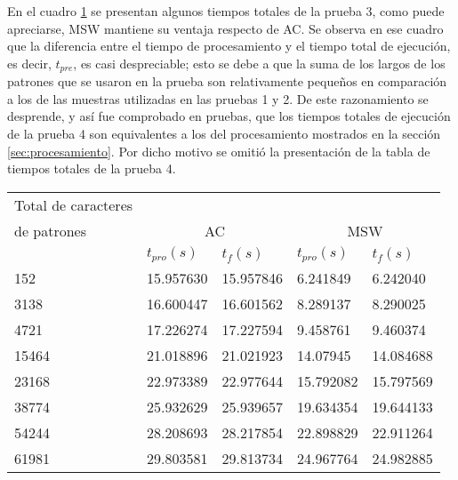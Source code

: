 {En el cuadro \ref{tab:Total3} se presentan algunos tiempos totales de la prueba 3, como puede apreciarse, MSW mantiene su ventaja respecto de AC. Se observa en ese cuadro que la diferencia entre el tiempo de procesamiento y el tiempo total de ejecución, es decir, $t_{pre}$, es casi despreciable; esto se debe a que la suma de los largos de los patrones que se usaron en la prueba son relativamente pequeños en comparación a los de las muestras utilizadas en las pruebas 1 y 2. De este razonamiento se desprende, y así fue comprobado en pruebas, que los tiempos totales de ejecución de la prueba 4 son equivalentes a los del procesamiento mostrados en la sección \ref{sec:procesamiento}. Por dicho motivo se omitió la presentación de la tabla de tiempos totales de la prueba 4.  
\begin{table}[H]
\begin{center}
 
\scalebox{0.7} {
\begin{tabular}{lllll}
\hline
  Total de caracteres\\ de patrones & \multicolumn{2}{c}{AC} & \multicolumn{2}{c}{MSW}\\

 & $t_{pro}(s)$ & $t_{f}(s)$
 & $t_{pro}(s)$ & $t_{f}(s)$ \\
  \midrule
    152&15.957630&15.957846&6.241849&6.242040\\
    3138&16.600447&16.601562&8.289137&8.290025\\
    4721&17.226274&17.227594&9.458761&9.460374\\
    15464&21.018896&21.021923&14.07945&14.084688\\
    23168&22.973389&22.977644&15.792082&15.797569\\
    38774&25.932629&25.939657&19.634354&19.644133\\
    54244&28.208693&28.217854&22.898829&22.911264\\
    61981&29.803581&29.813734&24.967764&24.982885\\
  \bottomrule
\end{tabular}
}
 \label{tab:Total3}
\end{center}
\end{table}
}
